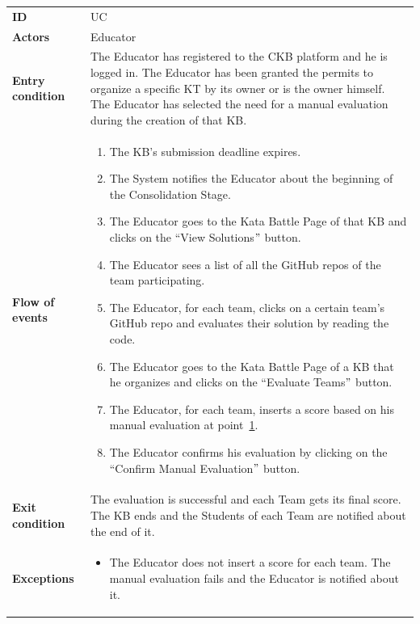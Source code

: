 \documentclass[11pt]{report}
\newcounter{uccounter}
\newcommand{\uc}{

    \addtocounter{uccounter}{1}
    UC\arabic{uccounter}
}
\begin{document}
\cleardoublepage
\begin{center}
\begin{longtable}[h] {|>{\columncolor[gray]{0.8}}l|p{100mm}|}
    \hline
    \multicolumn{2}{|c|}{\textbf{Evaluate Solution}} \\
    \hline
    \textbf{ID} & \uc
    \\
    \hline
    \textbf{Actors} & Educator
    \\
    \hline
    \textbf{Entry condition} & The Educator has registered to the CKB platform and he is logged in.
    The Educator has been granted the permits to organize a specific KT by its owner or is the owner himself.
    The Educator has selected the need for a manual evaluation during the creation of that KB\@.
    \\
    \hline
    \textbf{Flow of events}  & 
    \begin{enumerate}
        \item The KB's submission deadline expires.
        \item The System notifies the Educator about the beginning of the Consolidation Stage.
        \item The Educator goes to the Kata Battle Page of that KB and clicks on the ``View Solutions\("\) button.
        \item The Educator sees a list of all the GitHub repos of the team participating.
        \item The Educator, for each team, clicks on a certain team's GitHub repo and evaluates their solution by reading the code. \label{item_evaluate}
        \item The Educator goes to the Kata Battle Page of a KB that he organizes and clicks on the ``Evaluate Teams\("\) button.
        \item The Educator, for each team, inserts a score based on his manual evaluation at point~\ref{item_evaluate}.
        \item The Educator confirms his evaluation by clicking on the ``Confirm Manual Evaluation\("\) button.
    \end{enumerate}
    \\
    \hline
    \textbf{Exit condition}  & The evaluation is successful and each Team gets its final score.
    The KB ends and the Students of each Team are notified about the end of it.
    \\
    \hline
    \textbf{Exceptions}  & 
    \begin{itemize}
        \item The Educator does not insert a score for each team.
        The manual evaluation fails and the Educator is notified about it.
    \end{itemize}
    \\
    \hline
\end{longtable}
\end{center}
\end{document}
